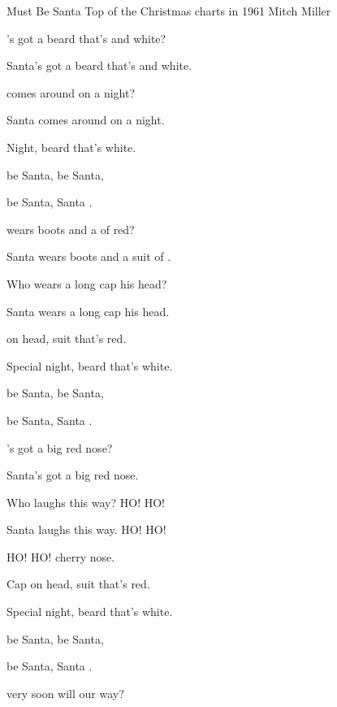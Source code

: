 \begin{SBSong}{Must Be Santa}
    {Top of the Christmas charts in 1961}
    {Mitch Miller}
  \begin{SBVerse}
    's got a beard that's  and white?
	
    Santa's got a beard that's  and white.
	
     comes around on a  night?
	
    Santa comes around on a  night.
	
     Night, beard that's white.
	
     be Santa,  be Santa,
	
     be Santa, Santa . 
  \end{SBVerse}
  \begin{SBVerse}
	 wears boots and a  of red?
	
    Santa wears boots and a suit of . 
	
	Who wears a long cap  his head?
	
    Santa wears a long cap  his head.
	
     on head, suit that's red.
	
    Special night, beard that's white.
	
     be Santa,  be Santa,
	
     be Santa, Santa .
  \end{SBVerse}
  \begin{SBVerse}	
	's got a big red  nose?
	
    Santa's got a big red  nose.
	
    Who laughs this way?  HO! HO!
	
    Santa laughs this way.  HO! HO!
	
     HO! HO! cherry nose.
	
    Cap on head, suit that's red.
	
    Special night, beard that's white.
	
     be Santa,  be Santa,
	
     be Santa, Santa .
  \end{SBVerse}
\CBPageBrk
  \begin{SBVerse}	
	 very soon will  our way?
	

\end{SBVerse}
\end{SBSong}
